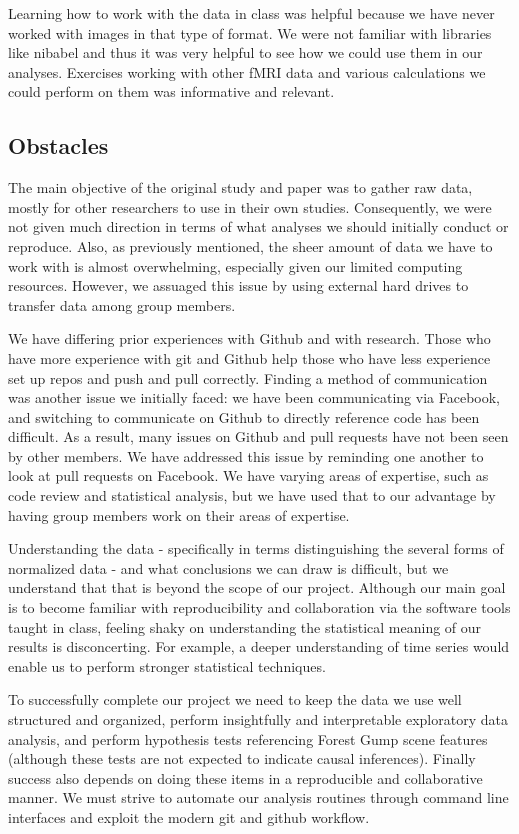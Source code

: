 \documentclass[11pt]{article}
\begin{document}
Learning how to work with the data in class was helpful because we have never
worked with images in that type of format. We were not familiar with libraries
like nibabel and thus it was very helpful to see how we could use them in our
analyses. Exercises working with other fMRI data and various calculations we
could perform on them was informative and relevant.


\subsection{Obstacles}

The main objective of the original study and paper was to gather raw data,
mostly for other researchers to use in their own studies. Consequently, we
were not given much direction in terms of what analyses we should initially
conduct or reproduce. Also, as previously mentioned, the sheer amount of data
we have to work with is almost overwhelming, especially given our limited
computing resources. However, we assuaged this issue by using external hard
drives to transfer data among group members.

We have differing prior experiences with Github and with research.  Those who
have more experience with git and Github help those who have less experience
set up repos and push and pull correctly.  Finding a method of communication
was another issue we initially faced: we have been communicating via Facebook,
and switching to communicate on Github to directly reference code has been
difficult.  As a result, many issues on Github and pull requests have not been
seen by other members.  We have addressed this issue by reminding one another
to look at pull requests on Facebook. We have varying areas of expertise, such
as code review and statistical analysis, but we have used that to our
advantage by having group members work on their areas of expertise.

Understanding the data - specifically in terms distinguishing the several
forms of normalized data - and what conclusions we can draw is difficult, but
we understand that that is beyond the scope of our project. Although our main
goal is to become familiar with reproducibility and collaboration via the
software tools taught in class, feeling shaky on understanding the statistical
meaning of our results is disconcerting. For example, a deeper understanding
of time series would enable us to perform stronger statistical techniques.

To successfully complete our project we need to keep the data we use well
structured and organized, perform insightfully and interpretable exploratory
data analysis, and perform hypothesis tests referencing Forest Gump scene
features (although these tests are not expected to indicate causal
inferences). Finally success also depends on doing these items in a
reproducible and collaborative manner. We must strive to automate our analysis
routines through command line interfaces and exploit the modern git and github
workflow.
\end{document}
